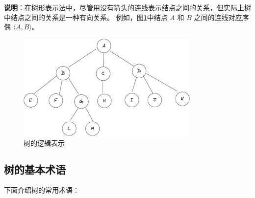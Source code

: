 \documentclass[lang=cn,newtx,10pt,scheme=chinese]{../elegantbook}
\begin{document}
\textbf{说明}：在树形表示法中，尽管用没有箭头的连线表示结点之间的关系，但实际上树中结点之间的关系是一种有向关系。
例如，图\ref{fig:tree}中结点 $A$ 和 $B$ 之间的连线对应序偶 $\langle A, B \rangle$。

\begin{figure}[h]
  \centering
  \includegraphics[width=0.8\textwidth]{./figure/pdf/cropped/tree.pdf}
  \caption{树的逻辑表示}
  \label{fig:tree}
\end{figure}
\subsection{树的基本术语}
下面介绍树的常用术语：
\end{document}
